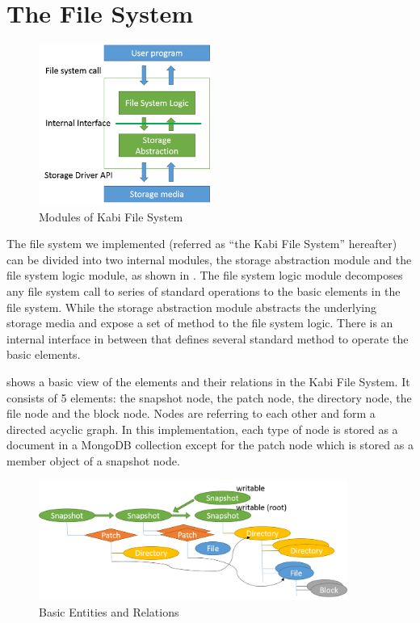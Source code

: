 \chapter{The File System}
\label{chap:fs}
\begin{figure}[hbtp]
\centering
\includegraphics[width=0.5\textwidth]{Chapter-3/figs/fig8.png}
\caption{Modules of Kabi File System}
\label{fig:modules}
\end{figure}

    The file system we implemented (referred as “the Kabi File System” hereafter) can be divided into two internal modules, the storage abstraction module and the file system logic module, as shown in . The file system logic module decomposes any file system call to series of standard operations to the basic elements in the file system. While the storage abstraction module abstracts the underlying storage media and expose a set of method to the file system logic. There is an internal interface in between that defines several standard method to operate the basic elements. 

     shows a basic view of the elements and their relations in the Kabi File System. It consists of 5 elements: the snapshot node, the patch node, the directory node, the file node and the block node. Nodes are referring to each other and form a directed acyclic graph. In this implementation, each type of node is stored as a document in a MongoDB collection except for the patch node which is stored as a member object of a snapshot node. 
    
\begin{figure}[hbtp]
\centering
\includegraphics[width=0.9\textwidth]{Chapter-3/figs/fig2.png}
\caption{Basic Entities and Relations}
\label{fig:basic_entities}
\end{figure}

